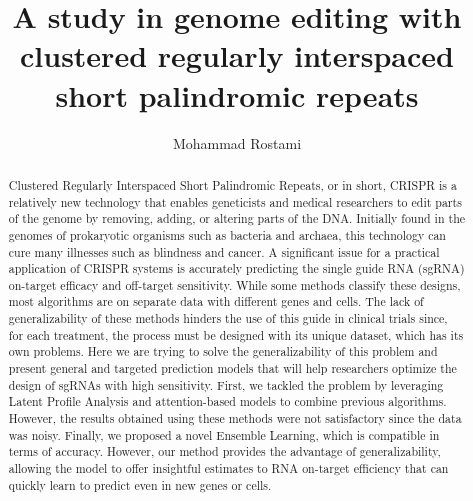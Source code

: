 \documentclass[12pt,a4paper,BCOR=.7cm,headsepline,bibliography=totoc]{report}
\begin{document}
\begin{thebibliography}{1}
\begin{latin}




\end{latin}

\end{thebibliography}
\printindex
\begin{latin}
\begin{abstract}
Clustered Regularly Interspaced Short Palindromic Repeats, or in short, CRISPR is a relatively new
technology that enables geneticists and medical researchers to edit parts of the genome by removing,
adding, or altering parts of the DNA. Initially found in the genomes of prokaryotic organisms such as
bacteria and archaea, this technology can cure many illnesses such as blindness and cancer. A significant
issue for a practical application of CRISPR systems is accurately predicting the single guide RNA
(sgRNA) on-target efficacy and off-target sensitivity. While some methods classify these designs, most
algorithms are on separate data with different genes and cells. The lack of generalizability of these methods
hinders the use of this guide in clinical trials since, for each treatment, the process must be designed
with its unique dataset, which has its own problems. Here we are trying to solve the generalizability
of this problem and present general and targeted prediction models that will help researchers optimize
the design of sgRNAs with high sensitivity. First, we tackled the problem by leveraging Latent Profile
Analysis and attention-based models to combine previous algorithms. However, the results obtained
using these methods were not satisfactory since the data was noisy. Finally,
we proposed a novel Ensemble Learning, which is compatible in terms of accuracy. However, our
method provides the advantage of generalizability, allowing the model to offer insightful estimates to
RNA on-target efficiency that can quickly learn to predict even in new genes or cells.
\end{abstract}
\end{latin}

\subject{‌Applied Mathematics}
\author{Mohammad Rostami}
\title{A study in genome editing with clustered regularly interspaced short palindromic repeats}
\date{\latintoday}
\makethesisenglishtitle
\end{document}
